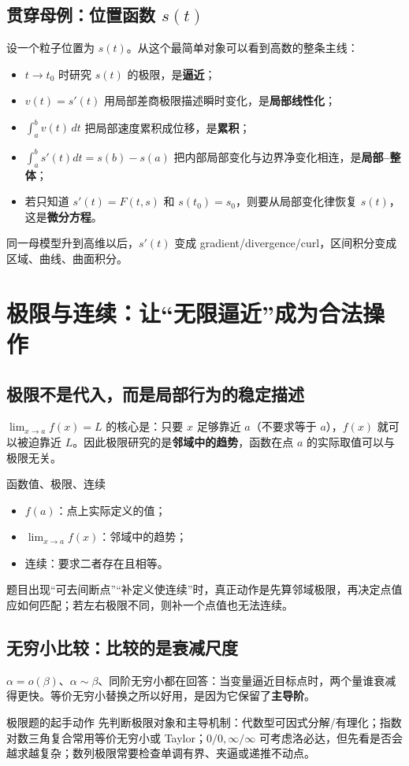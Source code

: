 \documentclass[11pt,a4paper,openany]{ctexbook}
\newcommand{\key}[1]{\textbf{\color{deep}#1}}\newcommand{\eng}[1]{\textit{#1}}\let\cleardoublepage\clearpage
\begin{document}
\section{贯穿母例：位置函数 $s(t)$}
设一个粒子位置为 $s(t)$。从这个最简单对象可以看到高数的整条主线：
\begin{itemize}
\item $t\to t_0$ 时研究 $s(t)$ 的极限，是\key{逼近}；
\item $v(t)=s'(t)$ 用局部差商极限描述瞬时变化，是\key{局部线性化}；
\item $\int_a^b v(t)\,dt$ 把局部速度累积成位移，是\key{累积}；
\item $\int_a^b s'(t)dt=s(b)-s(a)$ 把内部局部变化与边界净变化相连，是\key{局部--整体}；
\item 若只知道 $s'(t)=F(t,s)$ 和 $s(t_0)=s_0$，则要从局部变化律恢复 $s(t)$，这是\key{微分方程}。
\end{itemize}
同一母模型升到高维以后，$s'(t)$ 变成 gradient/divergence/curl，区间积分变成区域、曲线、曲面积分。

\chapter{极限与连续：让“无限逼近”成为合法操作}
\section{极限不是代入，而是局部行为的稳定描述}
$\lim_{x\to a}f(x)=L$ 的核心是：只要 $x$ 足够靠近 $a$（不要求等于 $a$），$f(x)$ 就可以被迫靠近 $L$。因此极限研究的是\key{邻域中的趋势}，函数在点 $a$ 的实际取值可以与极限无关。
\begin{boundarybox}{函数值、极限、连续}
\begin{itemize}
\item $f(a)$：点上实际定义的值；
\item $\lim_{x\to a}f(x)$：邻域中的趋势；
\item 连续：要求二者存在且相等。\end{itemize}
题目出现“可去间断点”“补定义使连续”时，真正动作是先算邻域极限，再决定点值应如何匹配；若左右极限不同，则补一个点值也无法连续。
\end{boundarybox}

\section{无穷小比较：比较的是衰减尺度}
$\alpha=o(\beta)$、$\alpha\sim\beta$、同阶无穷小都在回答：当变量逼近目标点时，两个量谁衰减得更快。等价无穷小替换之所以好用，是因为它保留了\key{主导阶}。
\begin{examBox}{极限题的起手动作}
先判断极限对象和主导机制：代数型可因式分解/有理化；指数对数三角复合常用等价无穷小或 Taylor；$0/0,\infty/\infty$ 可考虑洛必达，但先看是否会越求越复杂；数列极限常要检查单调有界、夹逼或递推不动点。
\end{examBox}
\end{document}
